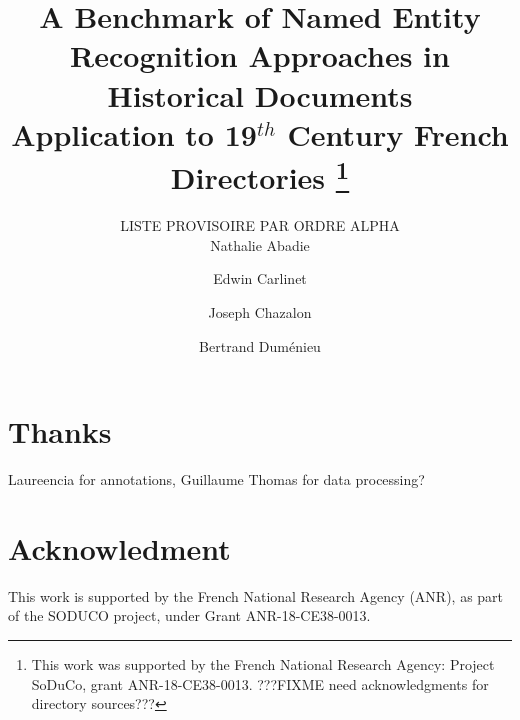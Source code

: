 \documentclass[runningheads,svgnames]{llncs}
\begin{document}
%
\title{A Benchmark of Named Entity Recognition Approaches in Historical Documents\\
Application to 19$^{th}$ Century French Directories%
\thanks{This work was supported by the French National Research Agency:
Project SoDuCo, grant ANR-18-CE38-0013. ???FIXME need acknowledgments for directory sources???}}
%
%
\author{LISTE PROVISOIRE PAR ORDRE ALPHA\\
%
Nathalie Abadie \and
Edwin Carlinet \and
Joseph Chazalon \and
Bertrand Duménieu}
%
%
%
\maketitle              %
%
\begin{abstract}

\end{abstract}









\section*{Thanks}
Laureencia for annotations, Guillaume Thomas for data processing?

\section*{Acknowledment}
This work is supported by the French National Research Agency (ANR), as part of the SODUCO project, under Grant ANR-18-CE38-0013.



\end{document}
